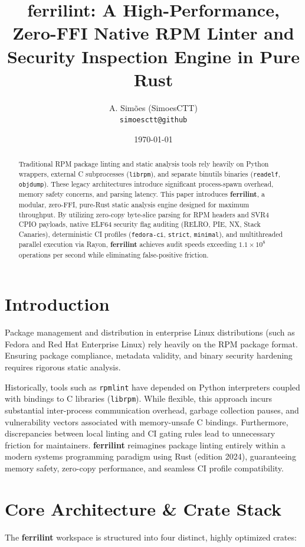 \documentclass[11pt,a4paper]{article}
\title{\textbf{ferrilint: A High-Performance, Zero-FFI Native RPM Linter and Security Inspection Engine in Pure Rust}}
\author{A. Simões (SimoesCTT) \\ \texttt{simoesctt@github}}
\date{\today}
\begin{document}
\maketitle

\begin{abstract}
Traditional RPM package linting and static analysis tools rely heavily on Python wrappers, external C subprocesses (\texttt{librpm}), and separate binutils binaries (\texttt{readelf}, \texttt{objdump}). These legacy architectures introduce significant process-spawn overhead, memory safety concerns, and parsing latency. This paper introduces \textbf{ferrilint}, a modular, zero-FFI, pure-Rust static analysis engine designed for maximum throughput. By utilizing zero-copy byte-slice parsing for RPM headers and SVR4 CPIO payloads, native ELF64 security flag auditing (RELRO, PIE, NX, Stack Canaries), deterministic CI profiles (\texttt{fedora-ci}, \texttt{strict}, \texttt{minimal}), and multithreaded parallel execution via Rayon, \textbf{ferrilint} achieves audit speeds exceeding $1.1 \times 10^8$ operations per second while eliminating false-positive friction.
\end{abstract}

\section{Introduction}
Package management and distribution in enterprise Linux distributions (such as Fedora and Red Hat Enterprise Linux) rely heavily on the RPM package format. Ensuring package compliance, metadata validity, and binary security hardening requires rigorous static analysis. 

Historically, tools such as \texttt{rpmlint} have depended on Python interpreters coupled with bindings to C libraries (\texttt{librpm}). While flexible, this approach incurs substantial inter-process communication overhead, garbage collection pauses, and vulnerability vectors associated with memory-unsafe C bindings. Furthermore, discrepancies between local linting and CI gating rules lead to unnecessary friction for maintainers. \textbf{ferrilint} reimagines package linting entirely within a modern systems programming paradigm using Rust (edition 2024), guaranteeing memory safety, zero-copy performance, and seamless CI profile compatibility.

\section{Core Architecture & Crate Stack}
The \textbf{ferrilint} workspace is structured into four distinct, highly optimized crates:
\end{document}
